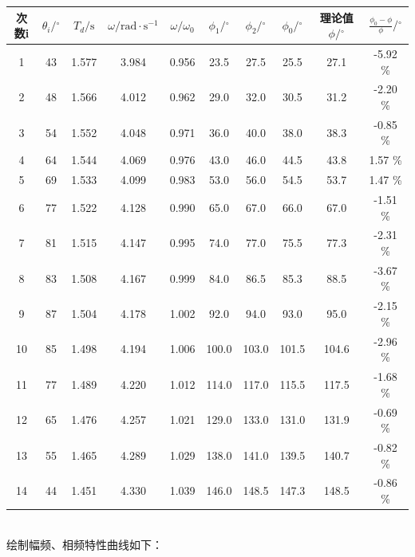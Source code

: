 \documentclass[UTF8]{ctexart}
\begin{document}
\begin{tabular}{|c|c|c|c|c|c|c|c|c|c|}
    \hline 次数i &    $\theta_{i} /{ }^{\circ}$ & $T_{d} / \mathrm{s}$ & $\omega / \mathrm{rad} \cdot \mathrm{s}^{-1} $&$ \omega / \omega_{0}$ & $\phi_{1} /{ }^{\circ} $& $\phi_{2} /{ }^{\circ}$ & $\phi_{0} /{ }^{\circ} $&  理论值 $ \phi /{ }^{\circ}$ & $\frac{\phi_{0}-\phi}{\phi} /{ }^{\circ}$ \\
    \hline 1 & 43 & 1.577 & 3.984 & 0.956 & 23.5 & 27.5 & 25.5 & 27.1 & -5.92 \% \\
    \hline 2 & 48 & 1.566 & 4.012 & 0.962 & 29.0 & 32.0 & 30.5 & 31.2 & -2.20 \% \\
    \hline 3 & 54 & 1.552 & 4.048 & 0.971 & 36.0 & 40.0 & 38.0 & 38.3 & -0.85 \% \\
    \hline 4 & 64 & 1.544 & 4.069 & 0.976 & 43.0 & 46.0 & 44.5 & 43.8 & 1.57 \% \\
    \hline 5 & 69 & 1.533 & 4.099 & 0.983 & 53.0 & 56.0 & 54.5 & 53.7 & 1.47 \% \\
    \hline 6 & 77 & 1.522 & 4.128 & 0.990 & 65.0 & 67.0 & 66.0 & 67.0 & -1.51 \% \\
    \hline 7 & 81 & 1.515 & 4.147 & 0.995 & 74.0 & 77.0 & 75.5 & 77.3 & -2.31 \% \\
    \hline 8 & 83 & 1.508 & 4.167 & 0.999 & 84.0 & 86.5 & 85.3 & 88.5 & -3.67 \% \\
    \hline 9 & 87 & 1.504 & 4.178 & 1.002 & 92.0 & 94.0 & 93.0 & 95.0 & -2.15 \% \\
    \hline 10 & 85 & 1.498 & 4.194 & 1.006 & 100.0 & 103.0 & 101.5 & 104.6 & -2.96 \% \\
    \hline 11 & 77 & 1.489 & 4.220 & 1.012 & 114.0 & 117.0 & 115.5 & 117.5 & -1.68 \% \\
    \hline 12 & 65 & 1.476 & 4.257 & 1.021 & 129.0 & 133.0 & 131.0 & 131.9 & -0.69 \% \\
    \hline 13 & 55 & 1.465 & 4.289 & 1.029 & 138.0 & 141.0 & 139.5 & 140.7 & -0.82 \% \\
    \hline 14 & 44 & 1.451 & 4.330 & 1.039 & 146.0 & 148.5 & 147.3 & 148.5 & -0.86 \% \\
    \hline
\end{tabular}\\


绘制幅频、相频特性曲线如下：
\end{document}

